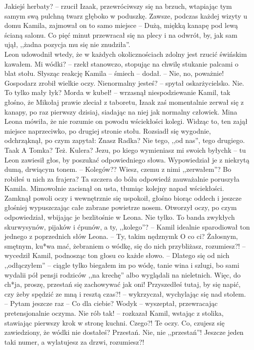 \documentclass[../MAIN.tex]{subfiles}
\begin{document}
\xx Jakiejś herbaty? -- rzucił Izaak, przewróciwszy się na brzuch, wtapiając tym samym swą pulchną twarz głęboko w poduszkę.
\qd
Zawsze, podczas każdej wizyty u domu Kamila, zajmował on to samo miejsce -- Dużą, miękką kanapę pod lewą ścianą salonu. Co pięć minut przewracał się na plecy i na odwrót, by, jak sam ujął, ,,żadna pozycja mu się nie znudziła''.\\
Leon udowodnił wtedy, że w każdych okolicznościach zdolny jest rzucić świńskim kawałem.
\sx Mi wódki? -- rzekł stanowczo, stopując na chwilę stukanie palcami o blat stołu. Słysząc reakcję Kamila -- śmiech -- dodał. -- Nie, no, poważnie!
\qd
Gospodarz zrobił wielkie oczy.
\sx Nienormalny jesteś? -- spytał oskarżycielsko.
\xx Nie. To tylko mały łyk?
\xx Morda w kubeł! -- wrzasnął niespodziewanie Kamil, tak głośno, że Mikołaj prawie zleciał z taboretu, Izaak zaś momentalnie zerwał się z kanapy, po raz pierwszy dzisiaj, siadając na niej jak normalny człowiek.
\qd
Mina Leona mówiła, że nie rozumie on powodu wściekłości kolegi. Widząc to, ten zajął miejsce naprzeciwko, po drugiej stronie stołu. Rozsiadł się wygodnie, odchrząknął, po czym zapytał:
\sx Znasz Radka? Nie tego, ,,od nas'', tego drugiego.
\xx Taa\3k
\xx A Tomka?
\xx Też.
\xx Kulera?
\xx Jezu, po kiego wymieniasz mi swoich byłych\3k -- tu Leon zawiesił głos, by poszukać odpowiedniego słowa. Wypowiedział je z niekrytą dumą, drwiącym tonem. -- Kolegów??
\xx Wiesz, czemu z nimi ,,zerwałem''?
\xx Bo robiłeś u nich za frajera?
\qd
Ta szczera do bólu odpowiedź zauważalnie poruszyła Kamila. Mimowolnie zacisnął on usta, tłumiąc kolejny napad wściekłości. Zamknął powoli oczy i wewnętrznie się uspokoił, głośno biorąc oddech i jeszcze głośniej wypuszczając całe zabrane powietrze nosem. Otworzył oczy, po czym odpowiedział, wbijając je bezlitośnie w Leona.
\sx Nie tylko. To banda zwykłych skurwysynów, pijaków i ćpunów, a ty, ,,kolego''? -- Kamil idealnie sparodiował ton jednego z poprzednich słów Leona. -- Ty, takim nędznym\3k
\xx O co ci?
\xx Żałosnym, smętnym, ku*wa mać, żebraniem o wódkę, się do nich przybliżasz, rozumiesz?! -- wycedził Kamil, podnosząc ton głosu co każde słowo. -- Dlatego się od nich ,,odłączyłem'' -- ciągle tylko biegałem im po wódę, tanie wina i szlugi, bo sami wydalii pół pensji rodziców ,,na krechę'' albo wyglądali na nieletnich. Więc, do ch*ja, proszę, przestań się zachowywać jak oni! Przyszedłeś tutaj, by się napić, czy żeby spędzić ze mną i resztą czas?! -- wykrzyczał, wychylając się nad stołem. -- Pytam jeszcze raz -- Co dla ciebie?
\xx Wody\3k -- wyszeptał, przewracając pretensjonalnie oczyma.
\xx Nie rób tak! -- rozkazał Kamil, wstając z stolika, stawiając pierwszy krok w stronę kuchni.
\xx Czego?!
\xx Te oczy. Co, czujesz się zawiedziony, że wódki nie dostałeś?
\xx Przestań.
\xx Nie, nie ,,przestań''! Jeszcze jeden taki numer, a wylatujesz za drzwi, rozumiesz?!
\qd
\end{document}
